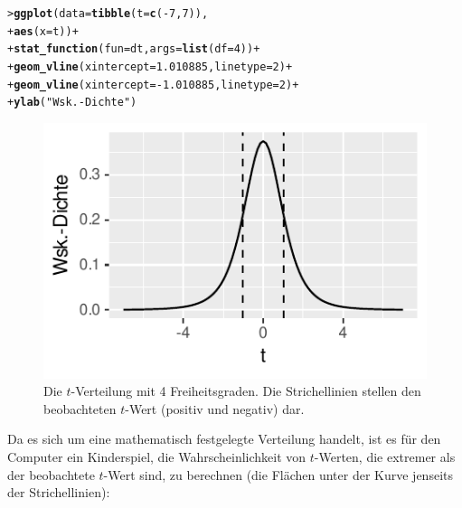 \documentclass[oneside, 10pt]{book}\usepackage[]{graphicx}\usepackage[]{xcolor}
\makeatletter
\newcommand{\hlnum}[1]{\textcolor[rgb]{0.686,0.059,0.569}{#1}}%
\newcommand{\hlstr}[1]{\textcolor[rgb]{0.192,0.494,0.8}{#1}}%
\newcommand{\hlopt}[1]{\textcolor[rgb]{0,0,0}{#1}}%
\newcommand{\hlstd}[1]{\textcolor[rgb]{0.345,0.345,0.345}{#1}}%
\newcommand{\hlkwc}[1]{\textcolor[rgb]{0.333,0.667,0.333}{#1}}%
\newcommand{\hlkwd}[1]{\textcolor[rgb]{0.737,0.353,0.396}{\textbf{#1}}}%
\newenvironment{kframe}{%
 \def\at@end@of@kframe{}%
 \ifinner\ifhmode%
  \def\at@end@of@kframe{\end{minipage}}%
  \begin{minipage}{\columnwidth}%
 \fi\fi%
 \def\FrameCommand##1{\hskip\@totalleftmargin \hskip-\fboxsep
 \colorbox{shadecolor}{##1}\hskip-\fboxsep
     \hskip-\linewidth \hskip-\@totalleftmargin \hskip\columnwidth}%
 \MakeFramed {\advance\hsize-\width
   \@totalleftmargin\z@ \linewidth\hsize
   \@setminipage}}%
 {\par\unskip\endMakeFramed%
 \at@end@of@kframe}
\newenvironment{knitrout}{}{} %
\makeatother
\begin{document}
\begin{knitrout}
\color{fgcolor}\begin{kframe}
\begin{alltt}
\hlstd{> }\hlkwd{ggplot}\hlstd{(}\hlkwc{data} \hlstd{=} \hlkwd{tibble}\hlstd{(}\hlkwc{t} \hlstd{=} \hlkwd{c}\hlstd{(}\hlopt{-}\hlnum{7}\hlstd{,} \hlnum{7}\hlstd{)),}
\hlstd{+ }       \hlkwd{aes}\hlstd{(}\hlkwc{x} \hlstd{= t))} \hlopt{+}
\hlstd{+ }  \hlkwd{stat_function}\hlstd{(}\hlkwc{fun} \hlstd{= dt,} \hlkwc{args} \hlstd{=} \hlkwd{list}\hlstd{(}\hlkwc{df} \hlstd{=} \hlnum{4}\hlstd{))} \hlopt{+}
\hlstd{+ }  \hlkwd{geom_vline}\hlstd{(}\hlkwc{xintercept} \hlstd{=} \hlnum{1.010885}\hlstd{,} \hlkwc{linetype} \hlstd{=} \hlnum{2}\hlstd{)} \hlopt{+}
\hlstd{+ }  \hlkwd{geom_vline}\hlstd{(}\hlkwc{xintercept} \hlstd{=} \hlopt{-}\hlnum{1.010885}\hlstd{,} \hlkwc{linetype} \hlstd{=} \hlnum{2}\hlstd{)} \hlopt{+}
\hlstd{+ }  \hlkwd{ylab}\hlstd{(}\hlstr{"Wsk.-Dichte"}\hlstd{)}
\end{alltt}
\end{kframe}\begin{figure}[tp]

{\centering \includegraphics[width=.5\textwidth]{figs/unnamed-chunk-366-1} 

}

\caption{Die $t$-Verteilung mit 4 Freiheitsgraden. Die Strichellinien stellen den beobachteten $t$-Wert (positiv und negativ) dar.\label{fig:distt2}}\label{fig:unnamed-chunk-366}
\end{figure}

\end{knitrout}

Da es sich um eine mathematisch festgelegte Verteilung handelt,
ist es für den Computer ein Kinderspiel, die Wahrscheinlichkeit
von $t$-Werten, die extremer als der beobachtete $t$-Wert sind, zu berechnen
(die Flächen unter der Kurve jenseits der Strichellinien):
\end{document}
